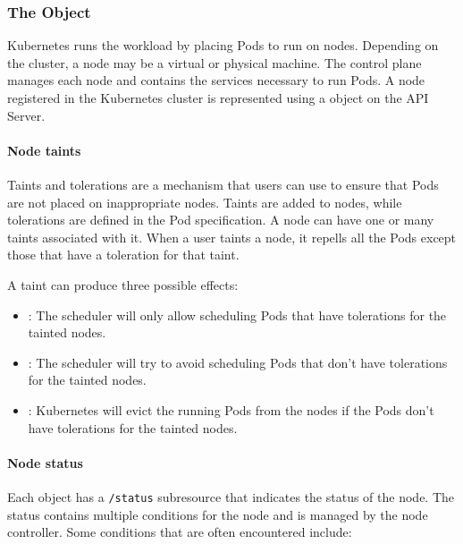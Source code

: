 

\subsubsection{The  Object}
Kubernetes runs the workload by placing Pods to run on nodes. Depending on the
cluster, a node may be a virtual or physical machine. The control plane manages
each node and contains the services necessary to run Pods. A node registered in
the Kubernetes cluster is represented using a  object on the API
Server.

\paragraph*{Node taints}
Taints and tolerations are a mechanism that users can use to ensure that Pods
are not placed on inappropriate nodes. Taints are added to nodes, while
tolerations are defined in the Pod specification. A node can have one or many
taints associated with it. When a user taints a node, it repells all the Pods
except those that have a toleration for that taint.


A taint can produce three possible effects:
\begin{itemize}
	\tightlist
	\item {}: The scheduler will only allow scheduling
	      Pods that have tolerations for the tainted nodes.
	\item {}: The scheduler will try to avoid
	      scheduling Pods that don’t have tolerations for the tainted nodes.
	\item {}: Kubernetes will evict the running Pods from the nodes
	      if the Pods don’t have tolerations for the tainted nodes.
\end{itemize}

\paragraph*{Node status}
\label{section:node-status}
Each  object has a \texttt{/status} subresource that indicates the status of
the node. The status contains multiple conditions for the node and is managed by
the node controller. Some conditions that are often encountered include:

